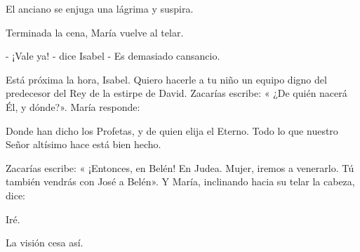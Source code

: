 \documentclass[12pt]{book} %
\begin{document}
El anciano se enjuga una lágrima y suspira. 

Terminada la cena, María vuelve al telar. 

- ¡Vale ya! - dice Isabel - Es demasiado cansancio. 

Está próxima la hora, Isabel. Quiero hacerle a tu niño un equipo digno del predecesor del Rey de la estirpe de David. Zacarías escribe: « ¿De quién nacerá Él, y dónde?». María responde: 

Donde han dicho los Profetas, y de quien elija el Eterno. Todo lo que nuestro Señor altísimo hace está bien hecho. 

Zacarías escribe: « ¡Entonces, en Belén! En Judea. Mujer, iremos a venerarlo. Tú también vendrás con José a Belén». Y María, inclinando hacia su telar la cabeza, dice: 

Iré. 

La visión cesa así. 
\end{document}
